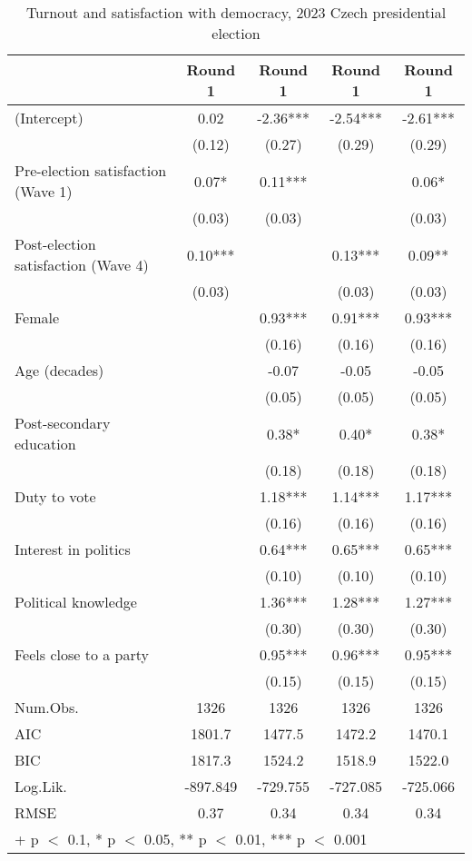 \begin{table}

\caption{\label{tab:unnamed-chunk-4}Turnout and satisfaction with democracy, 2023 Czech presidential election}
\centering
\begin{tabular}[t]{lcccc}
\toprule
  & Round 1 & Round 1  & Round 1   & Round 1   \\
\midrule
(Intercept) & 0.02 & -2.36*** & -2.54*** & -2.61***\\
 & (0.12) & (0.27) & (0.29) & (0.29)\\
Pre-election satisfaction (Wave 1) & 0.07* & 0.11*** &  & 0.06*\\
 & (0.03) & (0.03) &  & (0.03)\\
Post-election satisfaction (Wave 4) & 0.10*** &  & 0.13*** & 0.09**\\
 & (0.03) &  & (0.03) & (0.03)\\
Female &  & 0.93*** & 0.91*** & 0.93***\\
 &  & (0.16) & (0.16) & \vphantom{1} (0.16)\\
Age (decades) &  & -0.07 & -0.05 & -0.05\\
 &  & (0.05) & (0.05) & (0.05)\\
Post-secondary education &  & 0.38* & 0.40* & 0.38*\\
 &  & (0.18) & (0.18) & (0.18)\\
Duty to vote &  & 1.18*** & 1.14*** & 1.17***\\
 &  & (0.16) & (0.16) & (0.16)\\
Interest in politics &  & 0.64*** & 0.65*** & 0.65***\\
 &  & (0.10) & (0.10) & (0.10)\\
Political knowledge &  & 1.36*** & 1.28*** & 1.27***\\
 &  & (0.30) & (0.30) & (0.30)\\
Feels close to a party &  & 0.95*** & 0.96*** & 0.95***\\
 &  & (0.15) & (0.15) & (0.15)\\
\midrule
Num.Obs. & 1326 & 1326 & 1326 & 1326\\
AIC & 1801.7 & 1477.5 & 1472.2 & 1470.1\\
BIC & 1817.3 & 1524.2 & 1518.9 & 1522.0\\
Log.Lik. & -897.849 & -729.755 & -727.085 & -725.066\\
RMSE & 0.37 & 0.34 & 0.34 & 0.34\\
\bottomrule
\multicolumn{5}{l}{\rule{0pt}{1em}+ p $<$ 0.1, * p $<$ 0.05, ** p $<$ 0.01, *** p $<$ 0.001}\\
\end{tabular}
\end{table}
